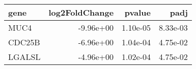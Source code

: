 \begin{tabular}{lrrr}
\toprule
  gene &  log2FoldChange &   pvalue &     padj \\
\midrule
  MUC4 &       -9.96e+00 & 1.10e-05 & 8.33e-03 \\
CDC25B &       -6.96e+00 & 1.04e-04 & 4.75e-02 \\
LGALSL &       -4.96e+00 & 1.02e-04 & 4.75e-02 \\
\bottomrule
\end{tabular}
